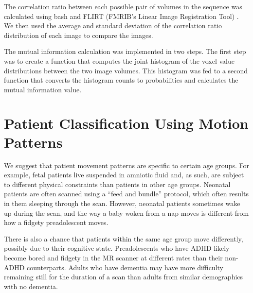 The correlation ratio between each possible pair of volumes in the sequence was calculated using bash and FLIRT (FMRIB’s Linear Image Registration Tool) \cite{Jenkinson2001} \cite{Jenkinson2002}. We then used the average and standard deviation of the correlation ratio distribution of each image to compare the images.

The mutual information calculation was implemented in two steps. The first step was to create a function that computes the joint histogram of the voxel value distributions between the two image volumes. This histogram was fed to a second function that converts the histogram counts to probabilities and calculates the mutual information value. 


\section{Patient Classification Using Motion Patterns} 


We suggest that patient movement patterns are specific to certain age groups. For example, fetal patients live suspended in amniotic fluid and, as such, are subject to different physical constraints than patients in other age groups. Neonatal patients are often scanned using a ``feed and bundle'' protocol, which often results in them sleeping through the scan. However, neonatal patients sometimes wake up during the scan, and the way a baby woken from a nap moves is different from how a fidgety preadolescent moves.

There is also a chance that patients within the same age group move differently, possibly due to their cognitive state. Preadolescents who have ADHD likely become bored and fidgety in the MR scanner at different rates than their non-ADHD counterparts. Adults who have dementia may have more difficulty remaining still for the duration of a scan than adults from similar demographics with no dementia.

